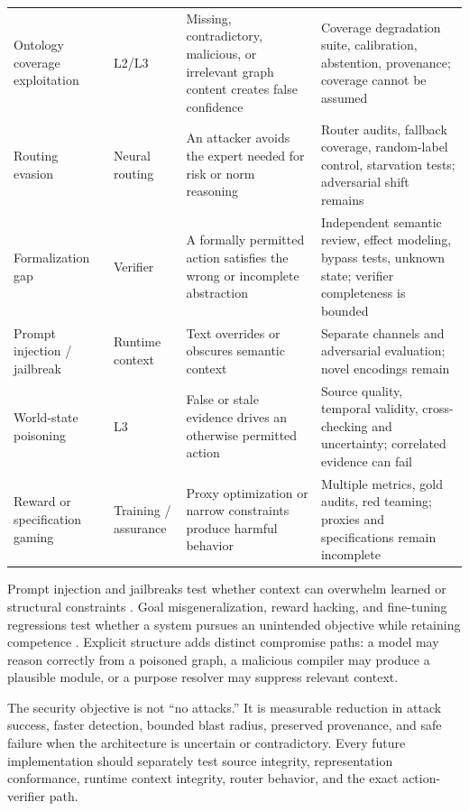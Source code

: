 \begin{table}[t]
\begin{tabularx}{\textwidth}{@{}>{\raggedright\arraybackslash}p{}>{\raggedright\arraybackslash}p{}>{\raggedright\arraybackslash}X>{\raggedright\arraybackslash}X@{}}
Ontology coverage exploitation & L2/L3 & Missing, contradictory, malicious, or irrelevant graph content creates false confidence & Coverage degradation suite, calibration, abstention, provenance; coverage cannot be assumed \\
Routing evasion & Neural routing & An attacker avoids the expert needed for risk or norm reasoning & Router audits, fallback coverage, random-label control, starvation tests; adversarial shift remains \\
Formalization gap & Verifier & A formally permitted action satisfies the wrong or incomplete abstraction & Independent semantic review, effect modeling, bypass tests, unknown state; verifier completeness is bounded \\
Prompt injection / jailbreak & Runtime context & Text overrides or obscures semantic context & Separate channels and adversarial evaluation; novel encodings remain \\
World-state poisoning & L3 & False or stale evidence drives an otherwise permitted action & Source quality, temporal validity, cross-checking and uncertainty; correlated evidence can fail \\
Reward or specification gaming & Training / assurance & Proxy optimization or narrow constraints produce harmful behavior & Multiple metrics, gold audits, red teaming; proxies and specifications remain incomplete \\
\bottomrule
\end{tabularx}
\end{table}

Prompt injection and jailbreaks test whether context can overwhelm learned or structural constraints \citep{zou2023universal,wei2023jailbroken}. Goal misgeneralization, reward hacking, and fine-tuning regressions test whether a system pursues an unintended objective while retaining competence \citep{langosco2022goalmisgeneralization,shah2022goalmisgeneralization,gao2023overoptimization,qi2023finetuning}. Explicit structure adds distinct compromise paths: a model may reason correctly from a poisoned graph, a malicious compiler may produce a plausible module, or a purpose resolver may suppress relevant context.

The security objective is not “no attacks.” It is measurable reduction in attack success, faster detection, bounded blast radius, preserved provenance, and safe failure when the architecture is uncertain or contradictory. Every future implementation should separately test source integrity, representation conformance, runtime context integrity, router behavior, and the exact action-verifier path.
